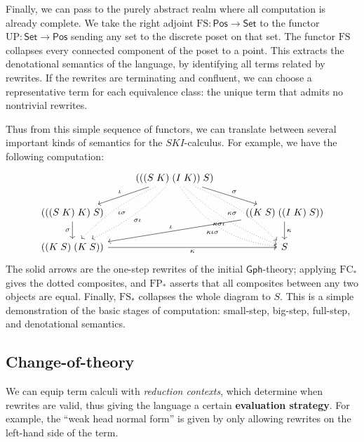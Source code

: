 \documentclass{amsart}
\theoremstyle{definition}
\newcommand{\Gph}{\mathsf{Gph}}
\newcommand{\Set}{\mathsf{Set}}
\newcommand{\Pos}{\mathsf{Pos}}
\newcommand{\FC}{\mathrm{FC}}
\newcommand{\FP}{\mathrm{FP}}
\newcommand{\FS}{\mathrm{FS}}
\newcommand{\UP}{\mathrm{UP}}
\newcommand{\maps}{\colon}
\begin{document}
Finally, we can pass to the purely abstract realm where all computation is already complete. We take the right adjoint $\FS\maps \Pos \to \Set$ to the functor $\UP \maps \Set \to \Pos$ sending any set to the discrete poset on that set.
The functor $\FS$ collapses every connected component of the poset to a point.   This extracts
the denotational semantics of the language, by identifying all terms related by rewrites.  If the rewrites are terminating and confluent, we can choose a representative term for each equivalence class: the unique term that admits no nontrivial rewrites.

Thus from this simple sequence of functors, we can translate between several important kinds of semantics for the $SKI$-calculus. For example, we have the following computation:
\[\begin{tikzcd}
&	(((S\; K)\; (I\; K))\; S) \arrow[rd,"\sigma"] \arrow[ld,swap,"\iota"] \arrow[ddl,dotted,bend left=10,"\sigma\iota"] \arrow[ddl,dotted,bend right=10,"\iota\sigma"] \arrow[ddr,dotted,swap,bend left=10,"\kappa\sigma"] \arrow[ddr,dotted,bend right=10,swap,"\kappa\sigma\iota"] \arrow[ddr,dotted,swap,bend right=25,"\kappa\iota\sigma"] &\\
(((S\; K)\; K)\; S) \arrow[d,swap,"\sigma"] & & ((K\; S)\; ((I\; K)\; S)) \arrow[lld,swap,"\iota"] \arrow[d,"\kappa"]\\
((K\; S)\; (K\; S)) \arrow[rr,swap,"\kappa"] & & S
\end{tikzcd}\]
The solid arrows are the one-step rewrites of the initial $\Gph$-theory; applying $\FC_*$ gives the dotted composites, and $\FP_*$ asserts that all composites between any two objects are equal. Finally, $\FS_*$ collapses the whole diagram to $S$. This is a simple demonstration of the basic stages of computation: small-step, big-step, full-step, and denotational semantics.

\subsection{Change-of-theory}

We can equip term calculi with \textit{reduction contexts}, which determine when rewrites are valid, thus giving the language a certain \textbf{evaluation strategy}. For example, the ``weak head normal form'' is given by only allowing rewrites on the left-hand side of the term.
\end{document}
